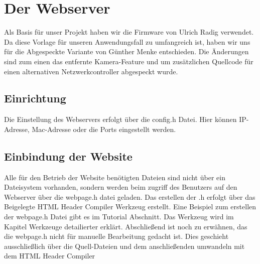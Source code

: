 \chapter{Der Webserver}

Als Basis für unser Projekt haben wir die Firmware von Ulrich Radig verwendet.
Da diese Vorlage für unseren Anwendungsfall zu umfangreich ist,  haben wir uns 
für die Abgespeckte Variante von Günther Menke entschieden. Die Änderungen sind
zum einen das entfernte Kamera-Feature und um zusätzlichen Quellcode für einen
alternativen Netzwerkcontroller abgespeckt wurde.

\section{Einrichtung}

Die Einstellung des Webservers erfolgt über die \textrm{config.h} Datei. Hier können
IP-Adresse, Mac-Adresse oder die Ports eingestellt werden.

\section{Einbindung der Website}

Alle für den Betrieb der Website benötigten Dateien sind nicht über ein
Dateisystem vorhanden, sondern werden beim zugriff des Benutzers auf den
Webserver über die \textrm{webpage.h} datei geladen.
Das erstellen der .h erfolgt über das Beigelegte \textrm{HTML Header Compiler}
Werkzeug erstellt. Eine Beispiel zum erstellen der \textrm{webpage.h} Datei gibt
es im Tutorial Abschnitt. Das Werkzeug wird im Kapitel Werkzeuge detailierter
erklärt. Abschließend ist noch zu erwähnen, das die \textrm{webpage.h} nicht für manuelle
Bearbeitung gedacht ist. Dies geschieht ausschließlich über die Quell-Dateien
und dem anschließenden umwandeln mit dem \textrm{HTML Header Compiler}


